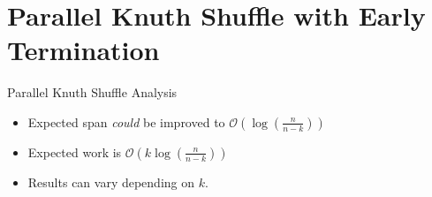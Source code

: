 \section{Parallel Knuth Shuffle with Early Termination}

\begin{frame}{Parallel Knuth Shuffle Analysis}
  \begin{itemize}
    \item Expected span \textit{could} be improved to 
      \(\mathcal{O}\left(\log\left(\frac{n}{n-k}\right)\right)\)
    \item Expected work is \(\mathcal{O}\left( k \log\left(\frac{n}{n-k}\right)\right)\)
    \item Results can vary depending on \(k\).
  \end{itemize}
\end{frame}
